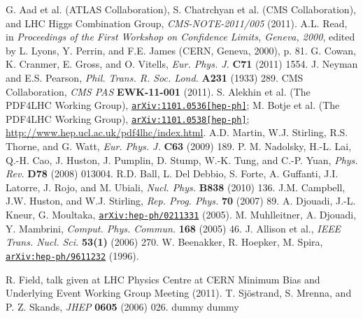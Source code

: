 \documentclass[12pt, letterpaper]{report}
\begin{document}
\begin{thebibliography}{99}

 G. Aad et al. (ATLAS Collaboration), S. Chatrchyan et al. (CMS Collaboration), and LHC Higgs Combination Group, \textit{CMS-NOTE-2011/005} (2011).
 A.L. Read, in \textit{Proceedings of the First Workshop on Confidence Limits, Geneva, 2000}, edited by L. Lyons, Y. Perrin, and F.E. James (CERN, Geneva, 2000), p. 81.
 G. Cowan, K. Cranmer, E. Gross, and O. Vitells, \textit{Eur. Phys. J.} \textbf{C71} (2011) 1554.
 J. Neyman and E.S. Pearson, \textit{Phil. Trans. R. Soc. Lond.} \textbf{A231} (1933) 289.
 CMS Collaboration, \textit{CMS PAS} \textbf{EWK-11-001} (2011).
 S. Alekhin et al. (The PDF4LHC Working Group), \href{http://arxiv.org/abs/1101.0536}{\texttt{arXiv:1101.0536[hep-ph]}}; M. Botje et al. (The PDF4LHC Working Group), \href{http://arxiv.org/abs/1101.0538}{\texttt{arXiv:1101.0538[hep-ph]}}; \url{http://www.hep.ucl.ac.uk/pdf4lhc/index.html}.
 A.D. Martin, W.J. Stirling, R.S. Thorne, and G. Watt, \textit{Eur. Phys. J.} \textbf{C63} (2009) 189.
 P. M. Nadolsky, H.-L. Lai, Q.-H. Cao, J. Huston, J. Pumplin, D. Stump, W.-K. Tung, and C.-P. Yuan, \textit{Phys. Rev.} \textbf{D78} (2008) 013004.
 R.D. Ball, L. Del Debbio, S. Forte, A. Guffanti, J.I. Latorre, J. Rojo, and M. Ubiali, \textit{Nucl. Phys.} \textbf{B838} (2010) 136.
 J.M. Campbell, J.W. Huston, and W.J. Stirling, \textit{Rep. Prog. Phys.} \textbf{70} (2007) 89.
 A. Djouadi, J.-L. Kneur, G. Moultaka, \href{http://arxiv.org/abs/hep-ph/0211331}{\texttt{arXiv:hep-ph/0211331}} (2005).
 M. Muhlleitner, A. Djouadi, Y. Mambrini, \textit{Comput. Phys. Commun.} \textbf{168} (2005) 46.
 J. Allison et al., \textit{IEEE Trans. Nucl. Sci.} \textbf{53(1)} (2006) 270.
 W. Beenakker, R. Hoepker, M. Spira, \href{http://arxiv.org/abs/hep-ph/9611232}{\texttt{arXiv:hep-ph/9611232}} (1996).


 R. Field, talk given at LHC Physics Centre at CERN Minimum Bias and Underlying Event Working Group Meeting (2011).
 T. Sj\"ostrand, S. Mrenna, and P. Z. Skands, \textit{JHEP} \textbf{0605} (2006) 026.
 dummy
 dummy
\end{thebibliography}
\end{document}
